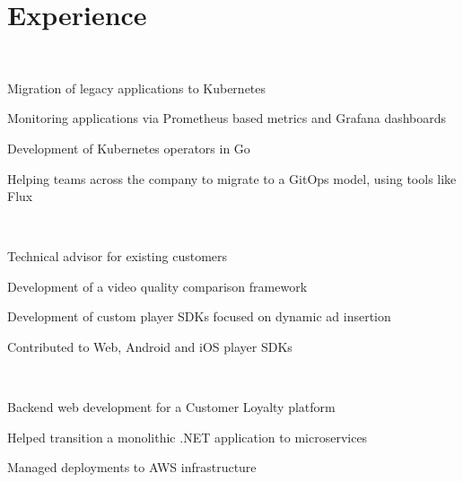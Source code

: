\documentclass[]{hieudo-build}
\begin{document}
\hfill
\begin{minipage}[t]{0.69\textwidth} 

\section{Experience}

\\
\vspace{0.9em} %
\begin{tightemize}
\item Migration of legacy applications to Kubernetes
\item Monitoring applications via Prometheus based metrics and Grafana dashboards
\item Development of Kubernetes operators in Go
\item Helping teams across the company to migrate to a GitOps model, using tools like Flux
\end{tightemize}

\sectionsep

\\
\begin{tightemize}
\item Technical advisor for existing customers
\item Development of a video quality comparison framework
\item Development of custom player SDKs focused on dynamic ad insertion
\item Contributed to Web, Android and iOS player SDKs
\end{tightemize}

\sectionsep

\\
\begin{tightemize}
\item Backend web development for a Customer Loyalty platform
\item Helped transition a monolithic .NET application to microservices
\item Managed deployments to AWS infrastructure
\end{tightemize}


\end{minipage}
\end{document}
